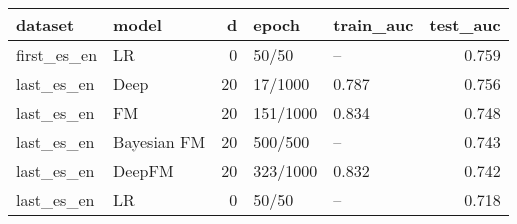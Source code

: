 \begin{tabular}{llrllr}
\toprule
     dataset &        model &   d &     epoch & train\_auc &  test\_auc \\
\midrule
 first\_es\_en &           LR &   0 &     50/50 &        -- &     0.759 \\
  last\_es\_en &         Deep &  20 &   17/1000 &     0.787 &     0.756 \\
  last\_es\_en &           FM &  20 &  151/1000 &     0.834 &     0.748 \\
  last\_es\_en &  Bayesian FM &  20 &   500/500 &        -- &     0.743 \\
  last\_es\_en &       DeepFM &  20 &  323/1000 &     0.832 &     0.742 \\
  last\_es\_en &           LR &   0 &     50/50 &        -- &     0.718 \\
\bottomrule
\end{tabular}
